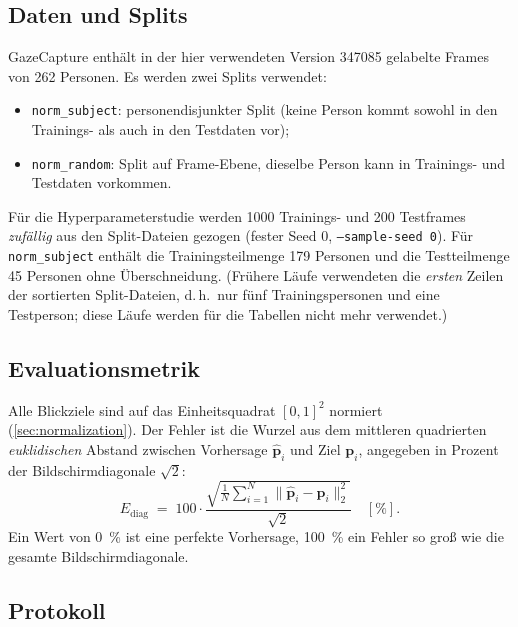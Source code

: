 \documentclass[
  11pt,
  a4paper,
  oneside,
  DIV=12,
  BCOR=8mm,
  parskip=half,
  headings=normal,
  bibliography=totoc,
  listof=totoc
]{scrreprt}
\newcommand{\code}[1]{\texttt{#1}}
\newcommand{\Ediag}{E_{\mathrm{diag}}}
\begin{document}
\subsection{Daten und Splits}
\label{sec:data}

GazeCapture enthält in der hier verwendeten Version \num{347085} gelabelte
Frames von 262 Personen. Es werden zwei Splits verwendet:
\begin{itemize}[nosep]
  \item \code{norm\_subject}: personendisjunkter Split (keine Person kommt
        sowohl in den Trainings- als auch in den Testdaten vor);
  \item \code{norm\_random}: Split auf Frame-Ebene, dieselbe Person kann in
        Trainings- und Testdaten vorkommen.
\end{itemize}
Für die Hyperparameterstudie werden \num{1000} Trainings- und \num{200}
Testframes \emph{zufällig} aus den Split-Dateien gezogen (fester Seed 0,
\code{--sample-seed 0}). Für \code{norm\_subject} enthält die
Trainingsteilmenge 179 Personen und die Testteilmenge 45 Personen ohne
Überschneidung. (Frühere Läufe verwendeten die \emph{ersten} Zeilen der
sortierten Split-Dateien, d.\,h.\ nur fünf Trainingspersonen und eine
Testperson; diese Läufe werden für die Tabellen nicht mehr verwendet.)

\subsection{Evaluationsmetrik}
\label{sec:metric}

Alle Blickziele sind auf das Einheitsquadrat $[0,1]^2$ normiert
(\cref{sec:normalization}). Der Fehler ist die Wurzel aus dem mittleren
quadrierten \emph{euklidischen} Abstand zwischen Vorhersage $\hat{\bm p}_i$
und Ziel $\bm p_i$, angegeben in Prozent der Bildschirmdiagonale $\sqrt{2}$:
\begin{equation}
  \Ediag \;=\; 100\cdot
  \frac{\sqrt{\frac{1}{N}\sum_{i=1}^{N}\lVert\hat{\bm p}_i-\bm p_i\rVert_2^{2}}}{\sqrt{2}}
  \quad[\%].
  \label{eq:ediag}
\end{equation}
Ein Wert von \SI{0}{\percent} ist eine perfekte Vorhersage,
\SI{100}{\percent} ein Fehler so groß wie die gesamte Bildschirmdiagonale.


\subsection{Protokoll}
\label{sec:protocol}
\end{document}
